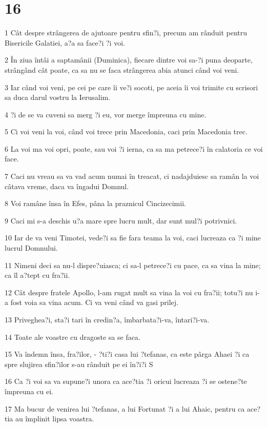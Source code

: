 \chapter{16}

\par 1 Cât despre strângerea de ajutoare pentru sfin?i, precum am rânduit pentru Bisericile Galatiei, a?a sa face?i ?i voi.
\par 2 În ziua întâi a saptamânii (Duminica), fiecare dintre voi sa-?i puna deoparte, strângând cât poate, ca sa nu se faca strângerea abia atunci când voi veni.
\par 3 Iar când voi veni, pe cei pe care îi ve?i socoti, pe aceia îi voi trimite cu scrisori sa duca darul vostru la Ierusalim.
\par 4 ?i de se va cuveni sa merg ?i eu, vor merge împreuna cu mine.
\par 5 Ci voi veni la voi, când voi trece prin Macedonia, caci prin Macedonia trec.
\par 6 La voi ma voi opri, poate, sau voi ?i ierna, ca sa ma petrece?i în calatoria ce voi face.
\par 7 Caci nu vreau sa va vad acum numai în treacat, ci nadajduiesc sa ramân la voi câtava vreme, daca va îngadui Domnul.
\par 8 Voi ramâne însa în Efes, pâna la praznicul Cincizecimii.
\par 9 Caci mi s-a deschis u?a mare spre lucru mult, dar sunt mul?i potrivnici.
\par 10 Iar de va veni Timotei, vede?i sa fie fara teama la voi, caci lucreaza ca ?i mine lucrul Domnului.
\par 11 Nimeni deci sa nu-l dispre?uiasca; ci sa-l petrece?i cu pace, ca sa vina la mine; ca îl a?tept cu fra?ii.
\par 12 Cât despre fratele Apollo, l-am rugat mult sa vina la voi cu fra?ii; totu?i nu i-a fost voia sa vina acum. Ci va veni când va gasi prilej.
\par 13 Priveghea?i, sta?i tari în credin?a, îmbarbata?i-va, întari?i-va.
\par 14 Toate ale voastre cu dragoste sa se faca.
\par 15 Va îndemn însa, fra?ilor, - ?ti?i casa lui ?tefanas, ca este pârga Ahaei ?i ca spre slujirea sfin?ilor s-au rânduit pe ei în?i?i S
\par 16 Ca ?i voi sa va supune?i unora ca ace?tia ?i oricui lucreaza ?i se ostene?te împreuna cu ei.
\par 17 Ma bucur de venirea lui ?tefanas, a lui Fortunat ?i a lui Ahaic, pentru ca ace?tia au împlinit lipsa voastra.
